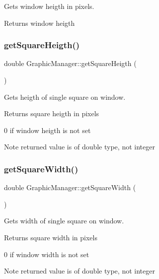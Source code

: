 Gets window heigth in pixels. 

\begin{DoxyReturn}{Returns}
window heigth 
\end{DoxyReturn}
\mbox{\label{class_graphic_manager_a2499a6f320e67a7955d7fdf96eda794d}} 
\subsubsection{\texorpdfstring{get\+Square\+Heigth()}{getSquareHeigth()}}
{\footnotesize\ttfamily double Graphic\+Manager\+::get\+Square\+Heigth (\begin{DoxyParamCaption}{ }\end{DoxyParamCaption})}



Gets heigth of single square on window. 

\begin{DoxyReturn}{Returns}
square heigth in pixels 

0 if window heigth is not set 
\end{DoxyReturn}
\begin{DoxyNote}{Note}
returned value is of double type, not integer 
\end{DoxyNote}
\mbox{\label{class_graphic_manager_acdd4dc3b2d89b0f76e04f66aaac2d78b}} 
\subsubsection{\texorpdfstring{get\+Square\+Width()}{getSquareWidth()}}
{\footnotesize\ttfamily double Graphic\+Manager\+::get\+Square\+Width (\begin{DoxyParamCaption}{ }\end{DoxyParamCaption})}



Gets width of single square on window. 

\begin{DoxyReturn}{Returns}
square width in pixels 

0 if window width is not set 
\end{DoxyReturn}
\begin{DoxyNote}{Note}
returned value is of double type, not integer 
\end{DoxyNote}
\mbox{\label{class_graphic_manager_a1606d81941e83aab67d178ce6866550f}} 
